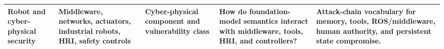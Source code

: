 \begin{table}[t]
\begin{tabularx}{\textwidth}{@{}p{}Y Y Y Y@{}}
\addlinespace
Robot and cyber-physical security \cite{dieber2020penetration,deng2022insecurityros2,neupane2024security,yaacoub2022robotics} & Middleware, networks, actuators, industrial robots, HRI, safety controls & Cyber-physical component and vulnerability class & How do foundation-model semantics interact with middleware, tools, HRI, and controllers? & Attack-chain vocabulary for memory, tools, ROS/middleware, human authority, and persistent state compromise. \\
\bottomrule
\end{tabularx}
\end{table}
